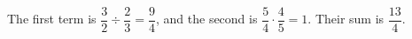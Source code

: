 The first term is $\dfrac{3}{2}\div\dfrac{2}{3}=\dfrac{9}{4}$, and the second is $\dfrac{5}{4}\cdot\dfrac{4}{5}=1$. Their sum is $\boxed{\dfrac{13}{4}}$.
